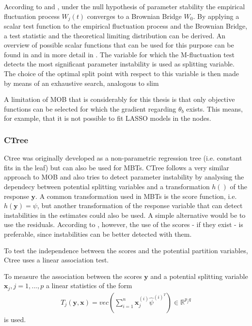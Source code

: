 According to \citep{Zeileis.2008} and \citep{Zeileis.2007}, under the null hypothesis of parameter stability the empirical fluctuation process $W_j(t)$ converges to a Brownian Bridge $W_0$. By applying a scalar test function to the empirical fluctuation process and the Brownian Bridge, a test statistic and the theoretical limiting distribution can be derived. An overview of possible scalar functions that can be used for this purpose can be found in \citep{Zeileis.2008} and in more detail in \citep{Zeileis.2007}.
The variable for which the M-fluctuation test detects the most significant parameter instability is used as splitting variable. The choice of the optimal split point with respect to this variable is then made by means of an exhaustive search, analogous to slim


A limitation of MOB that is considerably for this thesis is
that only objective functions can be selected for which the gradient regarding $\theta_b$  exists. This means, for example, that it is not possible to fit LASSO models in the nodes.



\subsubsection{CTree}
Ctree was originally developed as a non-parametric regression tree (i.e. constant fits in the leaf) but can also be used for MBTs.
CTree follows a very similar approach to MOB and also tries to detect parameter instability by analysing the dependecy between potential splitting variables and a transformation $h()$ of the response $\textbf{y}$.
A common transformation used in MBTs is the score function, i.e. $h(\textbf{y}) = \psi$, but another transformation of the response variable that can detect instabilities in the estimates could also be used. A simple alternative would be to use the residuals. According to \citep{Schlosser.2019}, however, the use of the scores - if they exist - is preferable, since instabilities can be better detected with them.

To test the independence between the scores and the potential partition variables, Ctree uses a linear association test.

To measure the association between the scores $\textbf{y}$ and a potential splitting variable $\textbf{x}_{j}, j = 1,...,p$ a linear statistics of the form 
\begin{align}
    T_{j}(\textbf{y},\textbf{x}) = vec\left(\sum_{i=1}^n \textbf{x}_j^{(i)}\hat{\psi}^{(i)}^T\right) \in \mathbb{R}^{p_{j}q}
\end{align}
is used. \citep{Hothorn.2006}

